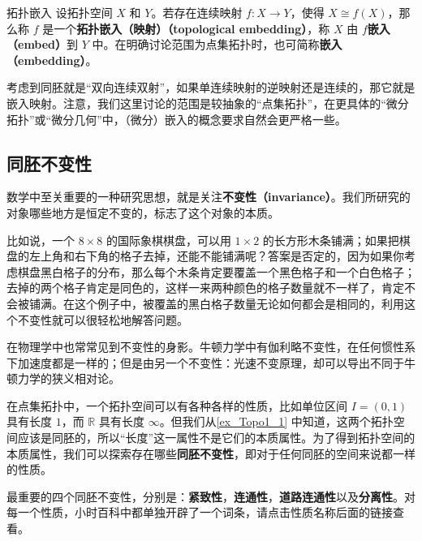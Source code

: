 \begin{definition}{拓扑嵌入}
设拓扑空间 $X$ 和 $Y$。若存在连续映射 $f:X\rightarrow Y$，使得 $X\cong f(X)$，那么称 $f$ 是一个\textbf{拓扑嵌入（映射）（topological embedding）}，称 $X$ 由 $f$\textbf{嵌入（embed）}到 $Y$ 中。在明确讨论范围为点集拓扑时，也可简称\textbf{嵌入（embedding）}。
\end{definition}

考虑到同胚就是“双向连续双射”，如果单连续映射的逆映射还是连续的，那它就是嵌入映射。注意，我们这里讨论的范围是较抽象的“点集拓扑”，在更具体的“微分拓扑”或“微分几何”中，（微分）嵌入的概念要求自然会更严格一些。




\subsection{同胚不变性}

数学中至关重要的一种研究思想，就是关注\textbf{不变性（invariance）}。我们所研究的对象哪些地方是恒定不变的，标志了这个对象的本质。

比如说，一个 $8\times8$ 的国际象棋棋盘，可以用 $1\times2$ 的长方形木条铺满；如果把棋盘的左上角和右下角的格子去掉，还能不能铺满呢？答案是否定的，因为如果你考虑棋盘黑白格子的分布，那么每个木条肯定要覆盖一个黑色格子和一个白色格子；去掉的两个格子肯定是同色的，这样一来两种颜色的格子数量就不一样了，肯定不会被铺满。在这个例子中，被覆盖的黑白格子数量无论如何都会是相同的，利用这个不变性就可以很轻松地解答问题。

在物理学中也常常见到不变性的身影。牛顿力学中有伽利略不变性，在任何惯性系下加速度都是一样的；但是由另一个不变性：光速不变原理，却可以导出不同于牛顿力学的狭义相对论。

在点集拓扑中，一个拓扑空间可以有各种各样的性质，比如单位区间 $I=(0,1)$ 具有长度 $1$，而 $\mathbb{R}$ 具有长度 $\infty$。但我们从\autoref{ex_Topo1_1} 中知道，这两个拓扑空间应该是同胚的，所以“长度”这一属性不是它们的本质属性。为了得到拓扑空间的本质属性，我们可以探索存在哪些\textbf{同胚不变性}，即对于任何同胚的空间来说都一样的性质。

最重要的四个同胚不变性，分别是：\textbf{紧致性}，\textbf{连通性}，\textbf{道路连通性}以及\textbf{分离性}。对每一个性质，小时百科中都单独开辟了一个词条，请点击性质名称后面的链接查看。
